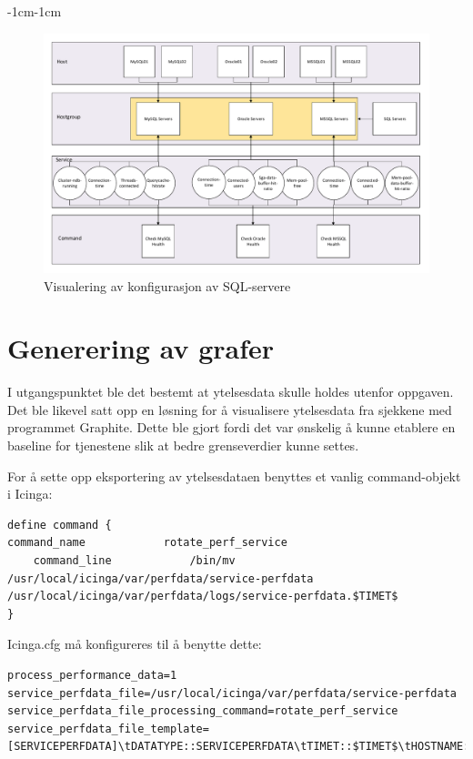 \begin{changemargin}{-1cm}{-1cm}
\begin{figure}[H]
    \centering
    \includegraphics[scale=0.55]{img/sql}
    \caption{Visualering av konfigurasjon av SQL-servere}
    \label{sql}
\end{figure}
\end{changemargin}
\clearpage

\section{Generering av grafer}
I utgangspunktet ble det bestemt at ytelsesdata skulle holdes utenfor oppgaven. Det ble likevel satt opp en løsning for å visualisere ytelsesdata fra sjekkene med programmet Graphite\cite{graphite}. Dette ble gjort fordi det var ønskelig å kunne etablere en baseline for tjenestene slik at bedre grenseverdier kunne settes.

For å sette opp eksportering av ytelsesdataen benyttes et vanlig command-objekt i Icinga:

\begin{lstlisting}
define command {
command_name            rotate_perf_service
    command_line            /bin/mv /usr/local/icinga/var/perfdata/service-perfdata /usr/local/icinga/var/perfdata/logs/service-perfdata.$TIMET$
}
\end{lstlisting}
 Icinga.cfg må konfigureres til å benytte dette:

\begin{lstlisting}
process_performance_data=1
service_perfdata_file=/usr/local/icinga/var/perfdata/service-perfdata
service_perfdata_file_processing_command=rotate_perf_service
service_perfdata_file_template=[SERVICEPERFDATA]\tDATATYPE::SERVICEPERFDATA\tTIMET::$TIMET$\tHOSTNAME::$HOSTNAME$\tSERVICEDESC::$SERVICEDESC$\tSERVICEPERFDATA::$SERVICEPERFDATA$service_perfdata_file_processing_interval=200
\end{lstlisting}

